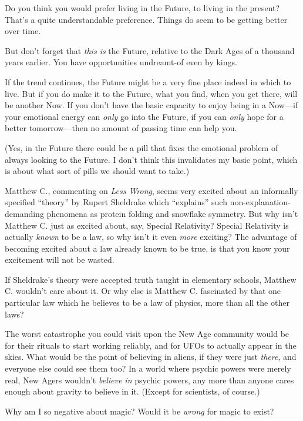 {
 Do you think you would prefer living in the Future, to living in
the present? That's a quite understandable preference.
Things do seem to be getting better over time.}

{
 But don't forget that \textit{this is} the Future,
relative to the Dark Ages of a thousand years earlier. You have
opportunities undreamt-of even by kings.}

{
 If the trend continues, the Future might be a very fine place
indeed in which to live. But if you do make it to the Future, what you
find, when you get there, will be another Now. If you
don't have the basic capacity to enjoy being in a
Now---if your emotional energy can \textit{only} go into the Future, if
you can \textit{only} hope for a better tomorrow---then no amount of
passing time can help you.}

{
 (Yes, in the Future there could be a pill that fixes the emotional
problem of always looking to the Future. I don't think
this invalidates my basic point, which is about what sort of pills we
should want to take.)}

{
 Matthew C., commenting on \textit{Less Wrong}, seems very excited
about an informally specified
``theory'' by Rupert Sheldrake which
``explains'' such
non-explanation-demanding phenomena as protein folding and snowflake
symmetry. But why isn't Matthew C. just as excited
about, say, Special Relativity? Special Relativity is actually
\textit{known} to be a law, so why isn't it even
\textit{more} exciting? The advantage of becoming excited about a law
already known to be true, is that you know your excitement will not be
wasted.}

{
 If Sheldrake's theory were accepted truth taught
in elementary schools, Matthew C. wouldn't care about
it. Or why else is Matthew C. fascinated by that one particular law
which he believes to be a law of physics, more than all the other
laws?}

{
 The worst catastrophe you could visit upon the New Age community
would be for their rituals to start working reliably, and for UFOs to
actually appear in the skies. What would be the point of believing in
aliens, if they were just \textit{there}, and everyone else could see
them too? In a world where psychic powers were merely real, New Agers
wouldn't \textit{believe in} psychic powers, any more
than anyone cares enough about gravity to believe in it. (Except for
scientists, of course.)}

{
 Why am I so negative about magic? Would it be \textit{wrong} for
magic to exist?}

